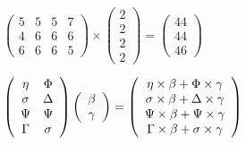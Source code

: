 \documentclass[12pt]{article}
\begin{document}
 
 
\noindent{}
 
 

 
$\left( \begin{array}{ccccccccccccccc}
           5  & 
           5  & 
           5  & 
           7  \\ 
           4  & 
           6  & 
           6  & 
           6  \\ 
           6  & 
           6  & 
           6  & 
           5
\end{array}\right) \times
\left( \begin{array}{c}
           2  \\ 
           2  \\ 
           2  \\ 
           2
\end{array}\right)  =
\left( \begin{array}{c}
          44  \\ 
          44  \\ 
          46
\end{array}\right)  $
 
$  %
 \left( \begin{array}
 {
 c
 c
 }
 \eta & 
 \Phi \\ 
 \sigma & 
 \Delta \\ 
 \Psi & 
 \Psi \\ 
 \Gamma & 
 \sigma
 \end{array} \right)
 \left( \begin{array}
 {
 c
 }
 \beta \\ 
 \gamma
 \end{array} \right)
=
 \left( \begin{array}
 {
 c
 }
  \eta \times  \beta +  \Phi \times  \gamma \\ 
  \sigma \times  \beta +  \Delta \times  \gamma \\ 
  \Psi \times  \beta +  \Psi \times  \gamma \\ 
  \Gamma \times  \beta +  \sigma \times  \gamma
 \end{array} \right)
$
 
 
 
\noindent{}
 
 

 
 
 
\noindent{}
 
\end{document}
